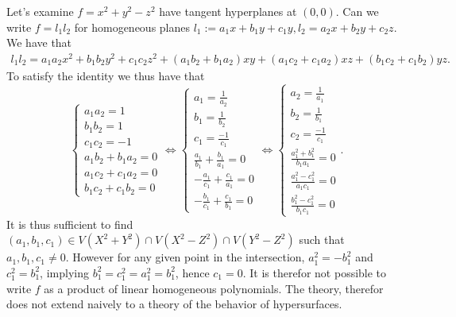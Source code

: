         \begin{example}
            Let's examine $f=x^2+y^2-z^2$ have tangent hyperplanes at $(0,0)$. Can we write $f=l_1l_2$ for homogeneous planes $l_1:= a_1x+b_1y+c_1y,l_2=a_2x+b_2y+c_2z$. We have that 
            \begin{align*}
                l_1l_2 = a_1a_2x^2+ b_1b_2y^2+c_1c_2z^2+(a_1b_2+b_1a_2)xy+(a_1c_2 +c_1a_2)xz+(b_1c_2 +c_1b_2)yz.
            \end{align*}
            To satisfy the identity we thus have that 
            $$\begin{cases}
                a_1a_2 = 1\\
                b_1b_2 = 1\\
                c_1c_2 = -1\\
                a_1b_2+b_1a_2 = 0\\
                a_1c_2+c_1a_2 = 0\\
                b_1c_2+c_1b_2 = 0
            \end{cases} \iff  \begin{cases}
                a_1 = \frac{1}{a_2}\\
                b_1 = \frac{1}{b_2}\\
                c_1 = \frac{-1}{c_1}\\
                \frac{a_1}{b_1} + \frac{b_1}{a_1}=0\\
                -\frac{a_1}{c_1}+\frac{c_1}{a_1} = 0\\
                -\frac{b_1}{c_1}+\frac{c_1}{b_1} = 0 
            \end{cases} \iff \begin{cases}
                a_2 = \frac{1}{a_1}\\
                b_2 = \frac{1}{b_1}\\
                c_2 = \frac{-1}{c_1}\\
                \frac{a_1^2+b_1^2}{b_1a_1}=0\\
                \frac{a_1^2-c_1^2}{a_1c_1} = 0\\
                \frac{b_1^2-c_1^2}{b_1c_1} = 0 
            \end{cases}.$$
            It is thus sufficient to find $(a_1,b_1,c_1)\in V(X^2+Y^2)\cap V(X^2-Z^2)\cap V(Y^2-Z^2)$ such that $a_1,b_1,c_1\neq 0$. 
            However for any given point in the intersection, $a_1^2 = -b_1^2$ and $c_1^2 = b_1^2$, implying $b_1^2 = c_1^2 =  a_1^2 = b_1^2$, hence $c_1=0$. It is therefor not possible to write $f$ as a product of linear homogeneous polynomials. The theory, therefor does not extend naively to a theory of the behavior of hypersurfaces. 
        \end{example}
